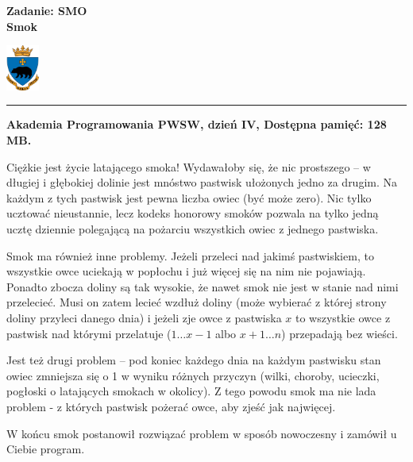 \documentclass[10pt]{article}
\begin{document}
    

    \noindent
    \begin{minipage}{0.5\textwidth}
        \LARGE{\textsf{\textbf{Zadanie: SMO\\Smok}}}
    \end{minipage}
    \begin{minipage}{0.5\textwidth}
        \begin{flushright}
            \includegraphics[height=1.5cm]{logo.jpg}
        \end{flushright}
    \end{minipage}
    
    \noindent\rule{\textwidth}{0.4pt}
    
    \noindent\textbf{Akademia Programowania PWSW, dzień IV, Dostępna pamięć: 128 MB.}
    \vspace{1em}
    
    
    \noindent
    Ciężkie jest życie latającego smoka! Wydawałoby się, że nic prostszego – w długiej i głębokiej dolinie jest mnóstwo pastwisk ułożonych jedno za drugim. Na każdym z tych pastwisk jest pewna liczba owiec (być może zero). Nic tylko ucztować nieustannie, lecz kodeks honorowy smoków pozwala na tylko jedną ucztę dziennie polegającą na pożarciu wszystkich owiec z jednego pastwiska.
    
    Smok ma również inne problemy. Jeżeli przeleci nad jakimś pastwiskiem, to wszystkie owce uciekają w popłochu i już więcej się na nim nie pojawiają. Ponadto zbocza doliny są tak wysokie, że nawet smok nie jest w stanie nad nimi przelecieć. Musi on zatem lecieć wzdłuż doliny (może wybierać z której strony doliny przyleci danego dnia) i jeżeli zje owce z pastwiska $x$ to wszystkie owce z pastwisk nad którymi przelatuje ($1\ldots x−1$ albo $x+1\ldots n$) przepadają bez wieści. 
    
    Jest też drugi problem – pod koniec każdego dnia na każdym pastwisku stan owiec zmniejsza się o 1 w wyniku różnych przyczyn (wilki, choroby, ucieczki, pogłoski o latających smokach w okolicy). Z tego powodu smok ma nie lada problem - z których pastwisk pożerać owce, aby zjeść jak najwięcej.
    
    W końcu smok postanowił rozwiązać problem w sposób nowoczesny i zamówił u Ciebie program.
\end{document}

